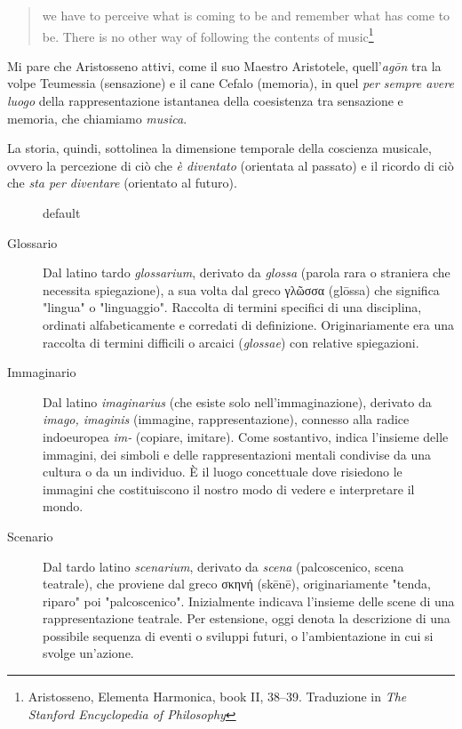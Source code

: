 \documentclass{gs}
\begin{document}
\begin{quote}
we have to perceive what is coming to be and remember what has come to be. There is no other way of following the contents of music\footnote{Aristosseno, Elementa Harmonica, book II, 38–39. Traduzione in \emph{The Stanford Encyclopedia of Philosophy}}
\end{quote}

Mi pare che Aristosseno attivi, come il suo Maestro Aristotele, quell'\emph{agōn} \cite{ronchi2001} tra la volpe Teumessia (sensazione) e il cane Cefalo (memoria), in quel \emph{per sempre avere luogo} della rappresentazione istantanea della coesistenza tra sensazione e memoria, che chiamiamo \emph{musica}.

La storia, quindi, sottolinea la dimensione temporale della coscienza musicale, ovvero la percezione di ciò che \emph{è diventato} (orientata al passato) e il ricordo di ciò che \emph{sta per diventare} (orientato al futuro).

\begin{figure}[htbp]
\begin{center}
\caption{default}
\label{default}
\end{center}
\end{figure}

\begin{description}

  \item[Glossario] Dal latino tardo \emph{glossarium}, derivato da \emph{glossa} (parola rara o straniera che necessita spiegazione), a sua volta dal greco \textgreek{γλῶσσα} (glōssa) che significa "lingua" o "linguaggio".
Raccolta di termini specifici di una disciplina, ordinati alfabeticamente e corredati di definizione. Originariamente era una raccolta di termini difficili o arcaici (\emph{glossae}) con relative spiegazioni.

  \item[Immaginario] Dal latino \emph{imaginarius} (che esiste solo nell'immaginazione), derivato da \emph{imago, imaginis} (immagine, rappresentazione), connesso alla radice indoeuropea \emph{im-} (copiare, imitare).
Come sostantivo, indica l'insieme delle immagini, dei simboli e delle rappresentazioni mentali condivise da una cultura o da un individuo. È il luogo concettuale dove risiedono le immagini che costituiscono il nostro modo di vedere e interpretare il mondo.

  \item[Scenario] Dal tardo latino \emph{scenarium}, derivato da \emph{scena} (palcoscenico, scena teatrale), che proviene dal greco \textgreek{σκηνή} (skēnē), originariamente "tenda, riparo" poi "palcoscenico".
Inizialmente indicava l'insieme delle scene di una rappresentazione teatrale. Per estensione, oggi denota la descrizione di una possibile sequenza di eventi o sviluppi futuri, o l'ambientazione in cui si svolge un'azione.

\end{description}
\end{document}
